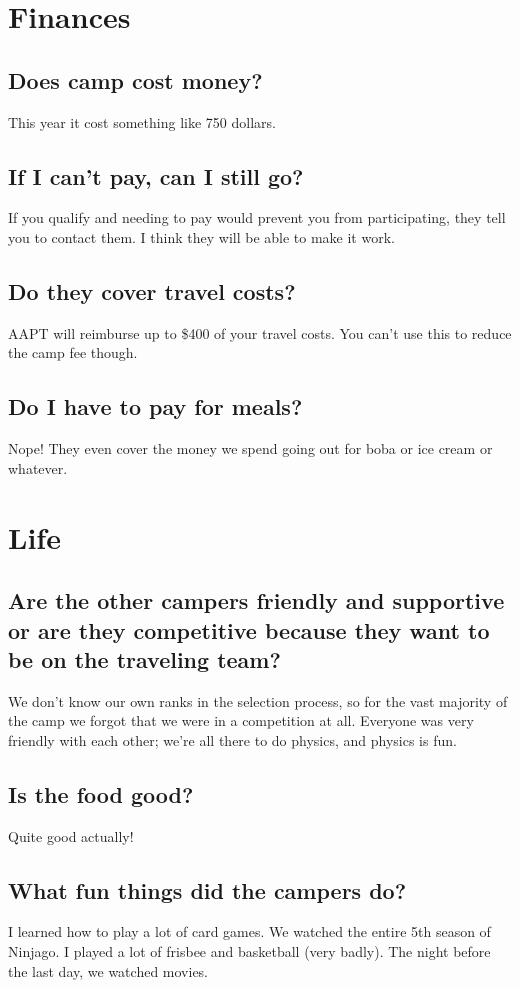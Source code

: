 \documentclass[11pt]{article}
\begin{document}
\section*{Finances}
\subsection*{Does camp cost money?}
This year it cost something like 750 dollars.
\subsection*{If I can’t pay, can I still go?}
If you qualify and needing to pay would prevent you from participating, they tell you to contact them. I think they will be able to make it work.
\subsection*{Do they cover travel costs?}
AAPT will reimburse up to \$400 of your travel costs. You can’t use this to reduce the camp fee though.
\subsection*{Do I have to pay for meals?}
Nope! They even cover the money we spend going out for boba or ice cream or whatever.
\section*{Life}
\subsection*{Are the other campers friendly and supportive or are they competitive because they want to be on the traveling team?}
We don’t know our own ranks in the selection process, so for the vast majority of the camp we forgot that we were in a competition at all. Everyone was very friendly with each other; we’re all there to do physics, and physics is fun.
\subsection*{Is the food good?}
Quite good actually!
\subsection*{What fun things did the campers do?}
I learned how to play a lot of card games. We watched the entire 5th season of Ninjago. I played a lot of frisbee and basketball (very badly). The night before the last day, we watched movies. 
\end{document}
